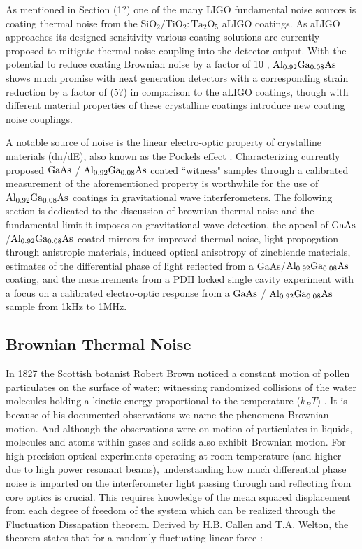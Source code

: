 
 As mentioned in Section (1?) one of the many LIGO fundamental noise sources is coating thermal noise from the $\mathrm{SiO_2}/\mathrm{TiO_2:Ta_2O_5}$ aLIGO coatings. As aLIGO approaches its designed sensitivity various coating solutions are currently proposed to mitigate thermal noise coupling into the detector output.
With the potential to reduce coating Brownian noise by a factor of 10 \cite{Cole:2013}, $\mathrm{Al_{0.92}Ga_{0.08}As}$ shows much promise with next generation detectors with a corresponding strain reduction by a factor of (5?) in comparison to the aLIGO coatings, though with different material properties of these crystalline coatings introduce new coating noise couplings.

A notable source of noise is the linear electro-optic property of crystalline materials (dn/dE), also known as the Pockels effect \cite{abernathy_poster}. Characterizing currently proposed $\mathrm{GaAs}$ / $\mathrm{Al_{0.92}Ga_{0.08}As}$ coated ``witness" samples through a calibrated measurement of the aforementioned property is worthwhile for the use of $\mathrm{Al_{0.92}Ga_{0.08}As}$ coatings in gravitational wave interferometers. The following section is dedicated to the discussion of brownian thermal noise and the fundamental limit it imposes on gravitational wave detection, the appeal of $\mathrm{GaAs}$/$\mathrm{Al_{0.92}Ga_{0.08}As}$ coated mirrors for improved thermal noise, light propogation through anistropic materials, induced optical anisotropy of zincblende materials, estimates of the differential phase of light reflected from a GaAs/$\mathrm{Al_{0.92}Ga_{0.08}As}$ coating, and the measurements from a PDH locked single cavity experiment with a focus on a calibrated electro-optic response from a $\mathrm{GaAs}$ / $\mathrm{Al_{0.92}Ga_{0.08}As}$ sample from 1kHz to 1MHz.

\subsection{Brownian Thermal Noise}
 In 1827 the Scottish botanist Robert Brown noticed a constant motion of pollen particulates on the surface of water; witnessing randomized collisions of the water molecules holding a kinetic energy proportional to the temperature ($k_BT$) \cite{Brown:1828}. It is because of his documented observations we name the phenomena Brownian motion. And although the observations were on motion of particulates in liquids, molecules and atoms within gases and solids also exhibit Brownian motion. For high precision optical experiments operating at room temperature (and higher due to high power resonant beams), understanding how much differential phase noise is imparted on the interferometer light passing through and reflecting from core optics is crucial. This requires knowledge of the mean squared displacement from each degree of freedom of the system which can be realized through the Fluctuation Dissapation theorem. Derived by H.B. Callen and T.A. Welton, the theorem states that for a randomly fluctuating linear force \cite{Callen:1951}:

